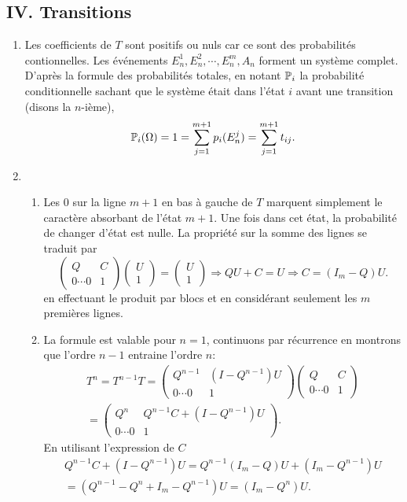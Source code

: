 \subsection*{IV. Transitions}
\begin{enumerate}
  \item Les coefficients de $T$ sont positifs ou nuls car ce sont des probabilités contionnelles.   
  Les événements $E_n^1, E_n^2, \cdots ,E_n^m, A_n$ forment un système complet. D'après la formule des probabilités totales, en notant $\mathbb{P}_i$ la probabilité conditionnelle sachant que le système était dans l'état $i$ avant une transition (disons la $n$-ième),
\[
  \mathbb{P}_i(\Omega) = 1 = \sum_{j=1}^{m+1}p_i(E_n^j) = \sum_{j=1}^{m+1} t_{i j}.
\]

  \item
  \begin{enumerate}
    \item Les $0$ sur la ligne $m+1$ en bas à gauche de $T$ marquent simplement le caractère absorbant de l'état $m+1$. Une fois dans cet état, la probabilité de changer d'état est nulle. La propriété sur la somme des lignes se traduit par 
\[
  \begin{pmatrix}
    Q & C \\ 0 \cdots 0 & 1
  \end{pmatrix}
\begin{pmatrix}
  U \\ 1
\end{pmatrix}
=
\begin{pmatrix}
  U \\ 1
\end{pmatrix}
\Rightarrow
Q U + C = U
\Rightarrow
C = (I_m - Q) U.
\]
en effectuant le produit par blocs et en considérant seulement les $m$ premières lignes.
    \item La formule est valable pour $n = 1$, continuons par récurrence en montrons que l'ordre $n-1$ entraine l'ordre $n$:
\begin{multline*}
  T^n = T^{n-1} T
  =
  \begin{pmatrix}
    Q^{n-1} & (I - Q^{n-1})U \\ 0 \cdots 0 & 1
  \end{pmatrix}
  \begin{pmatrix}
    Q & C \\ 0 \cdots 0 & 1
  \end{pmatrix}\\
  =
    \begin{pmatrix}
    Q^n & Q^{n-1}C + (I - Q^{n-1})U\\ 0 \cdots 0 & 1
  \end{pmatrix}.
\end{multline*}
En utilisant l'expression de $C$
\begin{multline*}
Q^{n-1}C + (I - Q^{n-1})U
= Q^{n-1}(I_m-Q)U + (I_m - Q^{n-1})U\\
= \left( Q^{n-1} -Q^n + I_m - Q^{n-1}\right)U
= \left( I_m - Q^{n}\right)U.
\end{multline*}
  \end{enumerate}


\end{enumerate}
